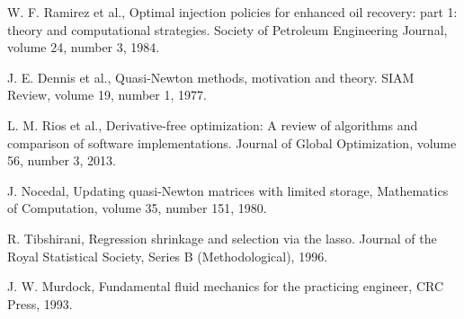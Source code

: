\documentclass[a4paper,onecolumn]{article}
\theoremstyle{remark}
\begin{document}
\begin{thebibliography}{1}
W. F. Ramirez et al.,
Optimal injection policies for enhanced oil recovery:
part 1: theory and computational strategies.
{Society of Petroleum Engineering Journal},
volume 24, number 3, 1984.

J. E. Dennis et al.,
Quasi-Newton methods, motivation and theory.
SIAM Review,
volume 19, number 1, 1977.

L. M. Rios et al.,
Derivative-free optimization: A review of algorithms and comparison of software implementations.
{Journal of Global Optimization}, 
volume 56, number 3, 2013.

J. Nocedal,
Updating quasi-Newton matrices with limited storage,
Mathematics of Computation, 
volume 35, number 151, 1980.

R. Tibshirani,
Regression shrinkage and selection via the lasso.
{Journal of the Royal Statistical Society, Series B (Methodological)},
1996.

J. W. Murdock,
Fundamental fluid mechanics for the practicing engineer,
{CRC Press}, 1993.



\end{thebibliography}
\end{document}
